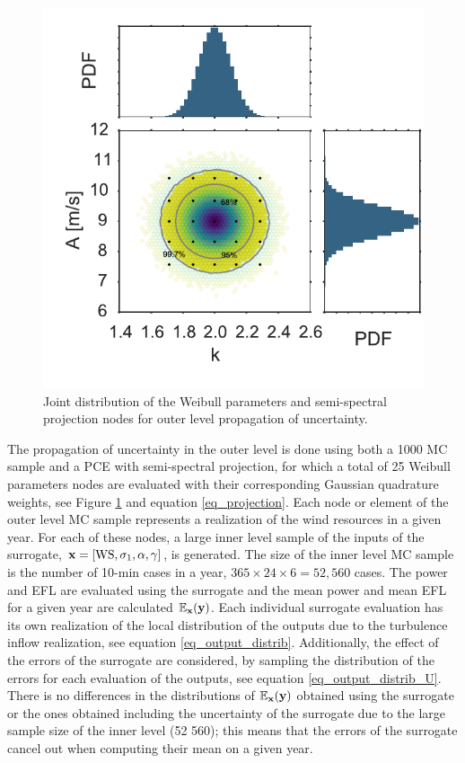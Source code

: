 \documentclass[preprint,12pt]{elsarticle}
\begin{document}
\begin{multicols}{2}
\begin{figure}[H]
\begin{centering}
\includegraphics[width=0.6\linewidth]{Figures/U_AEP/Resources_PCE.pdf}
\caption{Joint distribution of the Weibull parameters and semi-spectral projection nodes for outer level propagation of uncertainty.}
\label{fig_outer_PCE}
\end{centering}
\end{figure}
\end{multicols}

The propagation of uncertainty in the outer level is done using both a 1000 MC sample and a PCE with semi-spectral projection, for which a total of 25 Weibull parameters nodes are evaluated with their corresponding Gaussian quadrature weights, see Figure \ref{fig_outer_PCE} and equation \ref{eq_projection}. Each node or element of the outer level MC sample represents a realization of the wind resources in a given year. For each of these nodes, a large inner level sample of the inputs of the surrogate, $\mathbf{x}=[\text{WS}, \sigma_{1}, \alpha, \gamma]$, is generated. The size of the inner level MC sample is the number of 10-min cases in a year, $365\times24\times6=52,560$ cases. The power and EFL are evaluated using the surrogate and the mean power and mean EFL for a given year are calculated $\mathbb{E}_{\mathbf{x}}(\mathbf{y})$. Each individual surrogate evaluation has its own realization of the local distribution of the outputs due to the turbulence inflow realization, see equation \ref{eq_output_distrib}. Additionally, the effect of the errors of the surrogate are considered, by sampling the distribution of the errors for each evaluation of the outputs, see equation \ref{eq_output_distrib_U}. There is no differences in the distributions of  $\mathbb{E}_{\mathbf{x}}(\mathbf{y})$ obtained using the surrogate or the ones obtained including the uncertainty of the surrogate due to the large sample size of the inner level (52 560); this means that the errors of the surrogate cancel out when computing their mean on a given year. 
\end{document}

